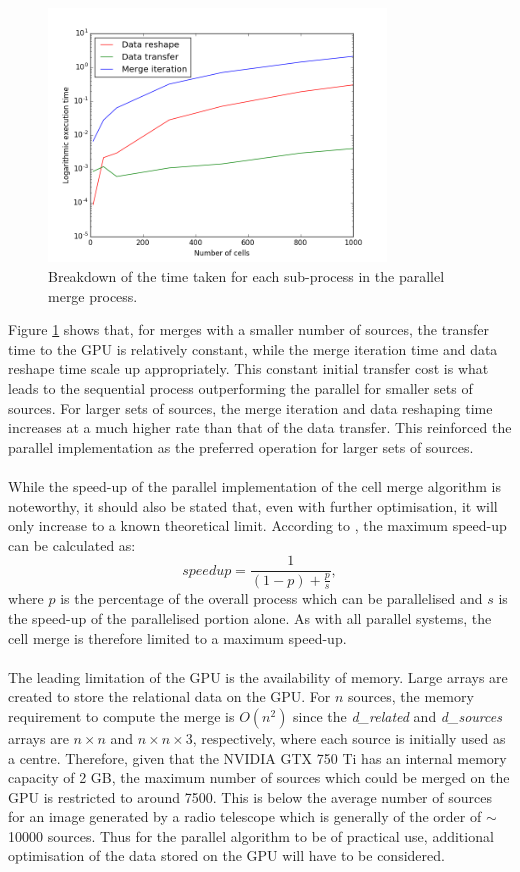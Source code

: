 \begin{figure}[H]
\centering
\includegraphics[width=0.8\textwidth]{Images/result_profile.png}
\caption{Breakdown of the time taken for each sub-process in the parallel merge process.}
\label{res:fig:prof}
\end{figure}
Figure \ref{res:fig:prof} shows that, for merges with a smaller number of sources, the transfer time to the GPU is relatively constant, while the merge iteration time and data reshape time scale up appropriately. This constant initial transfer cost is what leads to the sequential process outperforming the parallel for smaller sets of sources. For larger sets of sources, the merge iteration and data reshaping time increases at a much higher rate than that of the data transfer.  This reinforced the parallel implementation as the preferred operation for larger sets of sources.
\\
\\
While the speed-up of the parallel implementation of the cell merge algorithm is noteworthy, it should also be stated that, even with further optimisation, it will only increase to a known theoretical limit. According to \citet{amdahl1967validity}, the maximum speed-up can be calculated as:
\begin{equation}
	speedup = \frac{1}{(1-p)+\frac{p}{s}},
\end{equation}
where $p$ is the percentage of the overall process which can be parallelised and $s$ is the speed-up of the parallelised portion alone. As with all parallel systems, the cell merge is therefore limited to a maximum speed-up.
\\
\\
The leading limitation of the GPU is the availability of memory. Large arrays are created to store the relational data on the GPU. For $n$ sources, the memory requirement to compute the merge is $O(n^2)$ since the \textit{d\_related} and \textit{d\_sources} arrays are $n \times n$ and $n \times n \times 3$, respectively, where each source is initially used as a centre. Therefore, given that the NVIDIA GTX 750 Ti has an internal memory capacity of 2 GB, the maximum number of sources which could be merged on the GPU is restricted to around 7500. This is below the average number of sources for an image generated by a radio telescope which is generally of the order of $\sim$10000 sources. Thus for the parallel algorithm to be of practical use, additional optimisation of the data stored on the GPU will have to be considered.